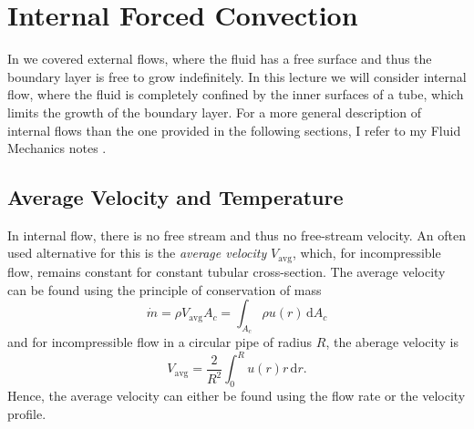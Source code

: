 

\section{Internal Forced Convection}
In  we covered external flows, where the fluid has a free surface and thus the boundary layer is free to grow indefinitely.
In this lecture we will consider internal flow, where the fluid is completely confined by the inner surfaces of a tube, which limits the growth of the boundary layer.
For a more general description of internal flows than the one provided in the following sections, I refer to my Fluid Mechanics notes .

\subsection{Average Velocity and Temperature}
In internal flow, there is no free stream and thus no free-stream velocity.
An often used alternative for this is the \textit{average velocity} $V_{\mathrm{avg}}$, which, for incompressible flow, remains constant for constant tubular cross-section.
The average velocity can be found using the principle of conservation of mass 
\begin{equation*}
  \dot{m} = \rho V_{\mathrm{avg}} A_c = \int_{A_c} \rho u(r) \, \mathrm{d}A_c
\end{equation*}
and for incompressible flow in a circular pipe of radius $R$, the aberage velocity is 
\begin{equation*}
  V_{\mathrm{avg}} = \frac{2}{R^2} \int_{0}^{R} u(r) r \, \mathrm{d}r
.\end{equation*}
Hence, the average velocity can either be found using the flow rate or the velocity profile.

